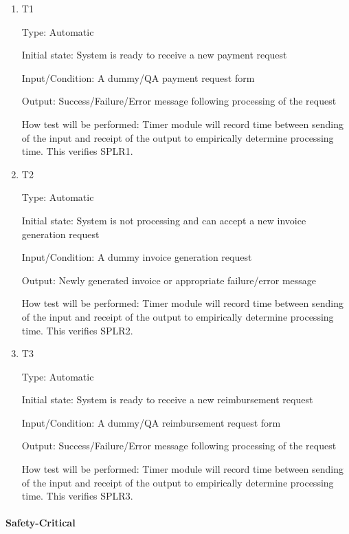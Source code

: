 \documentclass[12pt, titlepage]{article}
\begin{document}
\begin{enumerate}

\item{T1\\}
\hypertarget{NFR12.1-TC1}{}

Type: Automatic

Initial state: System is ready to receive a new payment request

Input/Condition: A dummy/QA payment request form

Output: Success/Failure/Error message following processing of the request

How test will be performed: Timer module will record time between sending of the input and receipt of the output to empirically determine processing time. This verifies SPLR1.
 
					
\item{T2\\}
\hypertarget{NFR12.1-TC2}{}

Type: Automatic

Initial state: System is not processing and can accept a new invoice generation request

Input/Condition: A dummy invoice generation request

Output: Newly generated invoice or appropriate failure/error message

How test will be performed: Timer module will record time between sending of the input and receipt of the output to empirically determine processing time. This verifies SPLR2.

\item{T3\\}
\hypertarget{NFR12.1-TC3}{}

Type: Automatic

Initial state: System is ready to receive a new reimbursement request

Input/Condition: A dummy/QA reimbursement request form

Output: Success/Failure/Error message following processing of the request

How test will be performed: Timer module will record time between sending of the input and receipt of the output to empirically determine processing time. This verifies SPLR3.

\end{enumerate}

\paragraph{Safety-Critical}
\end{document}
